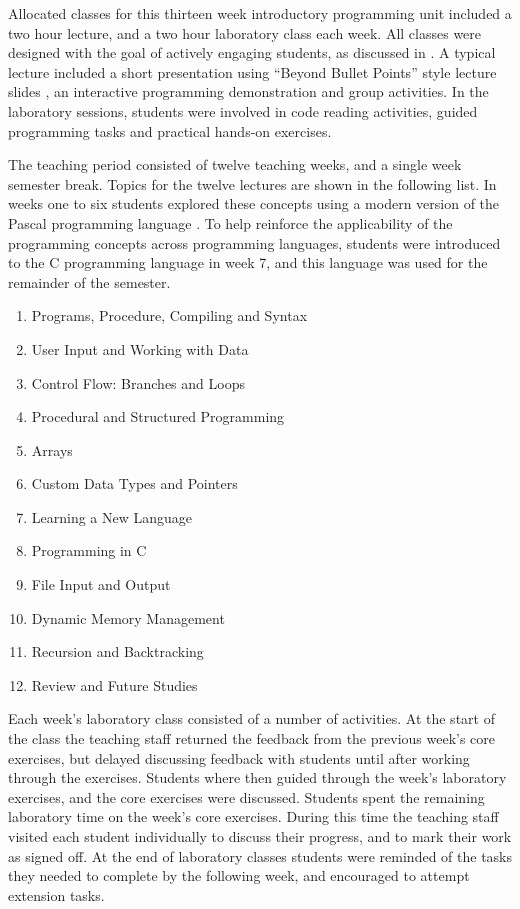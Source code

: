 Allocated classes for this thirteen week introductory programming unit included a two hour lecture, and a two hour laboratory class each week. All classes were designed with the goal of actively engaging students, as discussed in . A typical lecture included a short presentation using ``Beyond Bullet Points'' style lecture slides \cite{Atkinson:2007}, an interactive programming demonstration and group activities. In the laboratory sessions, students were involved in code reading activities, guided programming tasks and practical hands-on exercises.

The teaching period consisted of twelve teaching weeks, and a single week semester break. Topics for the twelve lectures are shown in the following list. In weeks one to six students explored these concepts using a modern version of the Pascal programming language \cite{Wirth:1971,FPC:2011}. To help reinforce the applicability of the programming concepts across programming languages, students were introduced to the C programming language \cite{Ritchie:1978} in week 7, and this language was used for the remainder of the semester. 

\begin{enumerate}
  \item Programs, Procedure, Compiling and Syntax
  \item User Input and Working with Data
  \item Control Flow: Branches and Loops
  \item Procedural and Structured Programming
  \item Arrays
  \item Custom Data Types and Pointers
  \item Learning a New Language
  \item Programming in C
  \item File Input and Output
  \item Dynamic Memory Management
  \item Recursion and Backtracking
  \item Review and Future Studies
\end{enumerate}

Each week's laboratory class consisted of a number of activities. At the start of the class the teaching staff returned the feedback from the previous week's core exercises, but delayed discussing feedback with students until after working through the exercises. Students where then guided through the week's laboratory exercises, and the core exercises were discussed. Students spent the remaining laboratory time on the week's core exercises. During this time the teaching staff visited each student individually to discuss their progress, and to mark their work as signed off. At the end of laboratory classes students were reminded of the tasks they needed to complete by the following week, and encouraged to attempt extension tasks.

